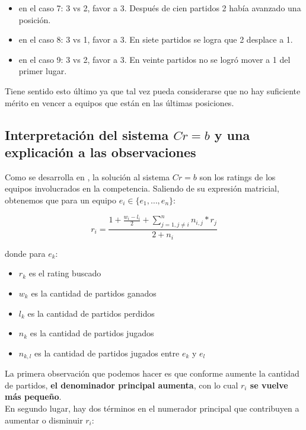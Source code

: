 \begin{itemize}
    \item en el caso 7: 3 vs 2, favor a 3. Después de cien partidos 2 había avanzado una posición.
    \item en el caso 8: 3 vs 1, favor a 3. En siete partidos se logra que 2 desplace a 1.
    \item en el caso 9: 3 vs 2, favor a 3. En veinte partidos no se logró mover a 1 del primer lugar.
\end{itemize}

Tiene sentido esto último ya que tal vez pueda considerarse que no hay suficiente mérito en vencer a equipos que están en las últimas posiciones.

\subsection{Interpretación del sistema $Cr = b$ y una explicación a las observaciones}\label{interpretacion_sistema}

Como se desarrolla en \cite{CMMpaper}, la solución al sistema $Cr = b$ son los ratings de los equipos involucrados en la competencia. Saliendo de su expresión matricial, obtenemos que para un equipo $e_i \in \{e_1, \dots, e_n\}$:

\begin{equation}
    r_i = \frac{1 + \frac{w_i - l_i}{2} + \sum_{j=1, j \neq i}^{n}{n_{i,j} * r_j}}{2 + n_i}    
\end{equation}

donde para $e_k$:

\begin{itemize}
    \item $r_k$ es el rating buscado
    \item $w_k$ es la cantidad de partidos ganados
    \item $l_k$ es la cantidad de partidos perdidos
    \item $n_k$ es la cantidad de partidos jugados
    \item $n_{k,l}$ es la cantidad de partidos jugados entre $e_k$ y $e_l$ 
\end{itemize}

La primera observación que podemos hacer es que conforme aumente la cantidad de partidos, \textbf{el denominador principal aumenta}, con lo cual \textbf{$r_i$ se vuelve más pequeño}.\\

En segundo lugar, hay dos términos en el numerador principal que contribuyen a aumentar o disminuir $r_i$:

